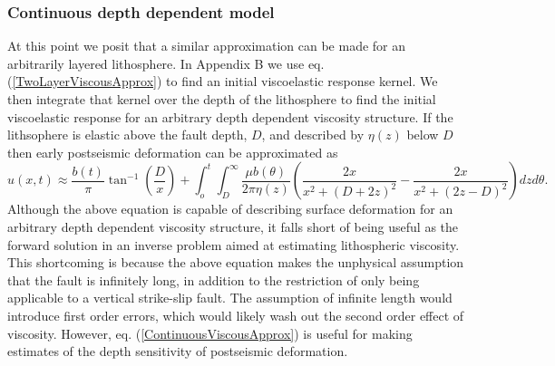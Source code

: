 \documentclass[extra,mreferee]{gji}
\begin{document}
\subsubsection{Continuous depth dependent model}
At this point we posit that a similar approximation can be made for an
arbitrarily layered lithosphere. In Appendix B we use
eq. (\ref{TwoLayerViscousApprox}) to find an initial viscoelastic
response kernel.  We then integrate that kernel over the depth of the
lithosphere to find the initial viscoelastic response for an arbitrary
depth dependent viscosity structure.  If the lithsophere is elastic
above the fault depth, $D$, and described by $\eta(z)$ below $D$ then
early postseismic deformation can be approximated as
\begin{equation}\label{ContinuousViscousApprox}
u(x,t) \approx \frac{b(t)}{\pi}\tan^{-1}(\frac{D}{x}) + 
               \int_o^t\int_D^\infty \frac{\mu b(\theta)}{2\pi\eta(z)}
                                    \left(\frac{2x}{x^2 + \left(D + 2z\right)^2} - 
                                    \frac{2x}{x^2 + \left(2z - D\right)^2}\right)
                                    dz d\theta.
\end{equation}
Although the above equation is capable of describing surface
deformation for an arbitrary depth dependent viscosity structure, it
falls short of being useful as the forward solution in an inverse
problem aimed at estimating lithospheric viscosity.  This shortcoming
is because the above equation makes the unphysical assumption that the
fault is infinitely long, in addition to the restriction of only being
applicable to a vertical strike-slip fault.  The assumption of
infinite length would introduce first order errors, which would likely
wash out the second order effect of viscosity. However,
eq. (\ref{ContinuousViscousApprox}) is useful for making estimates of
the depth sensitivity of postseismic deformation.
\end{document}
